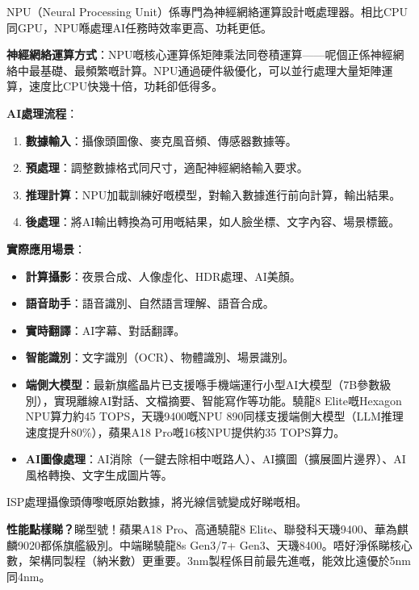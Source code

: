 
NPU（Neural Processing Unit）係專門為神經網絡運算設計嘅處理器。相比CPU同GPU，NPU喺處理AI任務時效率更高、功耗更低。

\textbf{神經網絡運算方式}：NPU嘅核心運算係矩陣乘法同卷積運算——呢個正係神經網絡中最基礎、最頻繁嘅計算。NPU通過硬件級優化，可以並行處理大量矩陣運算，速度比CPU快幾十倍，功耗卻低得多。

\textbf{AI處理流程}：

\begin{enumerate}
  \item \textbf{數據輸入}：攝像頭圖像、麥克風音頻、傳感器數據等。
  \item \textbf{預處理}：調整數據格式同尺寸，適配神經網絡輸入要求。
  \item \textbf{推理計算}：NPU加載訓練好嘅模型，對輸入數據進行前向計算，輸出結果。
  \item \textbf{後處理}：將AI輸出轉換為可用嘅結果，如人臉坐標、文字內容、場景標籤。
\end{enumerate}

\textbf{實際應用場景}：

\begin{itemize}
  \item \textbf{計算攝影}：夜景合成、人像虛化、HDR處理、AI美顏。
  \item \textbf{語音助手}：語音識別、自然語言理解、語音合成。
  \item \textbf{實時翻譯}：AI字幕、對話翻譯。
  \item \textbf{智能識別}：文字識別（OCR）、物體識別、場景識別。
  \item \textbf{端側大模型}：最新旗艦晶片已支援喺手機端運行小型AI大模型（7B參數級別），實現離線AI對話、文檔摘要、智能寫作等功能。驍龍8 Elite嘅Hexagon NPU算力約45 TOPS，天璣9400嘅NPU 890同樣支援端側大模型（LLM推理速度提升80\%），蘋果A18 Pro嘅16核NPU提供約35 TOPS算力。
  \item \textbf{AI圖像處理}：AI消除（一鍵去除相中嘅路人）、AI擴圖（擴展圖片邊界）、AI風格轉換、文字生成圖片等。
\end{itemize}


ISP處理攝像頭傳嚟嘅原始數據，將光線信號變成好睇嘅相。

\textbf{性能點樣睇？}睇型號！蘋果A18 Pro、高通驍龍8 Elite、聯發科天璣9400、華為麒麟9020都係旗艦級別。中端睇驍龍8s Gen3/7+ Gen3、天璣8400。唔好淨係睇核心數，架構同製程（納米數）更重要。3nm製程係目前最先進嘅，能效比遠優於5nm同4nm。

